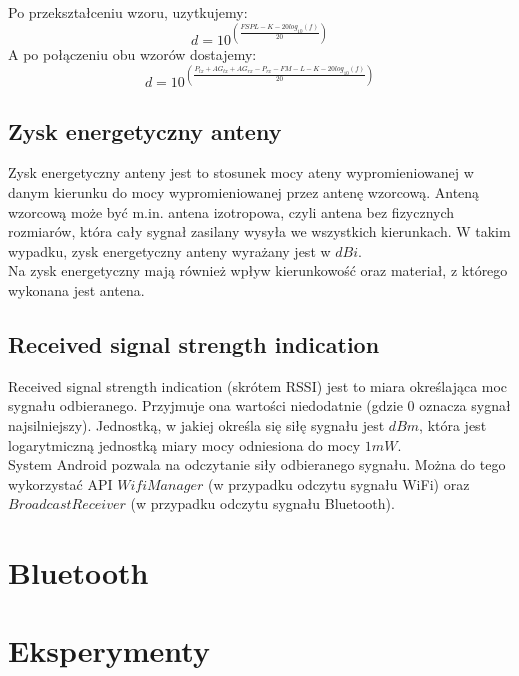 \documentclass{article}
\begin{document}
		  Po przekształceniu wzoru, uzytkujemy:
		  \begin{equation}
			  d = 10^{\left(\frac{FSPL - K - 20log_{10}(f)}{20}\right)}
		  \end{equation}
		  A po połączeniu obu wzorów dostajemy:
		  \begin{equation}
		  d = 10^{\left(\frac{P_{tx} + AG_{tx} + AG_{rx} - P_{rx} - FM - L - K - 20log_{10}(f)}{20}\right)}
		  \end{equation}
		\subsection{Zysk energetyczny anteny}
			Zysk energetyczny anteny jest to stosunek mocy ateny wypromieniowanej w danym kierunku do mocy wypromieniowanej przez antenę wzorcową. Anteną wzorcową może być m.in. antena izotropowa, czyli antena bez fizycznych rozmiarów, która cały sygnał zasilany wysyła we wszystkich kierunkach. W takim wypadku, zysk energetyczny anteny wyrażany jest w $dBi$.\\
			Na zysk energetyczny mają również wpływ kierunkowość oraz materiał, z którego wykonana jest antena.
		\subsection{Received signal strength indication}
			Received signal strength indication (skrótem RSSI) jest to miara określająca moc sygnału odbieranego. Przyjmuje ona wartości niedodatnie (gdzie 0 oznacza sygnał najsilniejszy). Jednostką, w jakiej określa się siłę sygnału jest $dBm$, która jest logarytmiczną jednostką miary mocy odniesiona do mocy $1mW$.\\
			System Android pozwala na odczytanie siły odbieranego sygnału. Można do tego wykorzystać API $WifiManager$ (w przypadku odczytu sygnału WiFi) oraz $BroadcastReceiver$ (w przypadku odczytu sygnału Bluetooth).
	\section{Bluetooth}
	\section{Eksperymenty}
\end{document}
